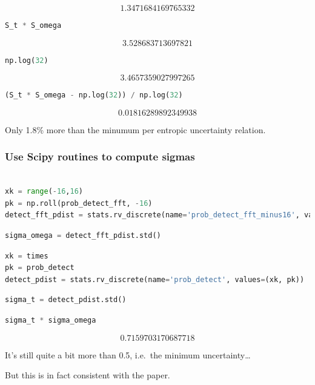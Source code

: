 \[1.3471684169765332\]

\begin{lstlisting}[language=Python]
S_t * S_omega
\end{lstlisting}

\[3.528683713697821\]

\begin{lstlisting}[language=Python]
np.log(32)
\end{lstlisting}

\[3.4657359027997265\]

\begin{lstlisting}[language=Python]
(S_t * S_omega - np.log(32)) / np.log(32)
\end{lstlisting}

\[0.01816289892349938\]

Only 1.8\% more than the minumum per entropic uncertainty relation.

\hypertarget{use-scipy-routines-to-compute-sigmas}{%
\subsubsection{Use Scipy routines to compute
sigmas}\label{use-scipy-routines-to-compute-sigmas}}

\begin{lstlisting}[language=Python]

xk = range(-16,16)
pk = np.roll(prob_detect_fft, -16)
detect_fft_pdist = stats.rv_discrete(name='prob_detect_fft_minus16', values=(xk, pk))
\end{lstlisting}

\begin{lstlisting}[language=Python]
sigma_omega = detect_fft_pdist.std()
\end{lstlisting}

\begin{lstlisting}[language=Python]
xk = times
pk = prob_detect
detect_pdist = stats.rv_discrete(name='prob_detect', values=(xk, pk))
\end{lstlisting}

\begin{lstlisting}[language=Python]
sigma_t = detect_pdist.std()
\end{lstlisting}

\begin{lstlisting}[language=Python]
sigma_t * sigma_omega
\end{lstlisting}

\[0.7159703170687718\]

It's still quite a bit more than 0.5, i.e.~the minimum
uncertainty\ldots{}

But this is in fact consistent with the paper.
